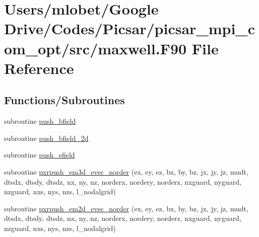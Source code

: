 \hypertarget{maxwell_8_f90}{}\section{Users/mlobet/\+Google Drive/\+Codes/\+Picsar/picsar\+\_\+mpi\+\_\+com\+\_\+opt/src/maxwell.F90 File Reference}
\label{maxwell_8_f90}
\subsection*{Functions/\+Subroutines}
\begin{DoxyCompactItemize}
\item 
subroutine \hyperlink{maxwell_8_f90_a75ea12320587bf0d23918391e0952a67}{push\+\_\+bfield}
\item 
subroutine \hyperlink{maxwell_8_f90_ab071dbd6a8ae1615451d59d1d3ec10ec}{push\+\_\+bfield\+\_\+2d}
\item 
subroutine \hyperlink{maxwell_8_f90_ae33c1a73468580a8c382b7afcd9918ba}{push\+\_\+efield}
\item 
subroutine \hyperlink{maxwell_8_f90_a55489cfc836273b0bd0a89edae5ecac1}{pxrpush\+\_\+em3d\+\_\+evec\+\_\+norder} (ex, ey, ez, bx, by, bz, jx, jy, jz, mudt,                                                                                                                                           dtsdx, dtsdy, dtsdz, nx, ny, nz,                                                                                                                                                                   norderx, nordery, norderz,                                                                                                                                                                               nxguard, nyguard, nzguard, nxs, nys, nzs,                                                                                                                               l\+\_\+nodalgrid)
\item 
subroutine \hyperlink{maxwell_8_f90_acd53cfd42fd4e1bc7cfa3d46437a9781}{pxrpush\+\_\+em2d\+\_\+evec\+\_\+norder} (ex, ey, ez, bx, by, bz, jx, jy, jz, mudt,                                                                                                                                           dtsdx, dtsdy, dtsdz, nx, ny, nz,                                                                                                                                                                   norderx, nordery, norderz,                                                                                                                                                                               nxguard, nyguard, nzguard, nxs, nys, nzs,                                                                                                                               l\+\_\+nodalgrid)

\end{DoxyCompactItemize}

